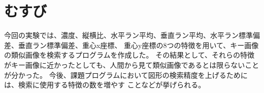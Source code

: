 \section{むすび}
今回の実験では、濃度、縦横比、水平ラン平均、垂直ラン平均、水平ラン標準偏差、垂直ラン標準偏差、重心x座標、
重心y座標の8つの特徴を用いて、キー画像の類似画像を検索するプログラムを作成した。
その結果として、それらの特徴がキー画像に近かったとしても、人間から見て類似画像であるとは限らないことが分かった。
今後、課題プログラムにおいて図形の検索精度を上げるためには、検索に使用する特徴の数を増やす
ことなどが挙げられる。

